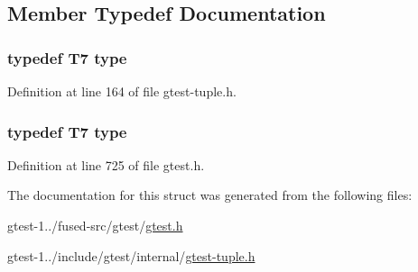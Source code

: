 \subsection{\-Member \-Typedef \-Documentation}
\hypertarget{structstd_1_1tr1_1_1gtest__internal_1_1TupleElement_3_01true_00_017_00_01GTEST__10__TUPLE___07T_08_4_a1407106c1eb93c1ef7727c48a9225859}{
\subsubsection[{type}]{\setlength{\rightskip}{0pt plus 5cm}typedef \-T7 {\bf type}}}\label{db/d6d/structstd_1_1tr1_1_1gtest__internal_1_1TupleElement_3_01true_00_017_00_01GTEST__10__TUPLE___07T_08_4_a1407106c1eb93c1ef7727c48a9225859}


\-Definition at line 164 of file gtest-\/tuple.\-h.

\hypertarget{structstd_1_1tr1_1_1gtest__internal_1_1TupleElement_3_01true_00_017_00_01GTEST__10__TUPLE___07T_08_4_a1407106c1eb93c1ef7727c48a9225859}{
\subsubsection[{type}]{\setlength{\rightskip}{0pt plus 5cm}typedef \-T7 {\bf type}}}\label{db/d6d/structstd_1_1tr1_1_1gtest__internal_1_1TupleElement_3_01true_00_017_00_01GTEST__10__TUPLE___07T_08_4_a1407106c1eb93c1ef7727c48a9225859}


\-Definition at line 725 of file gtest.\-h.



\-The documentation for this struct was generated from the following files\-:\begin{DoxyCompactItemize}
\item 
gtest-\/1../fused-\/src/gtest/\hyperlink{fused-src_2gtest_2gtest_8h}{gtest.\-h}\item 
gtest-\/1../include/gtest/internal/\hyperlink{gtest-tuple_8h}{gtest-\/tuple.\-h}\end{DoxyCompactItemize}
